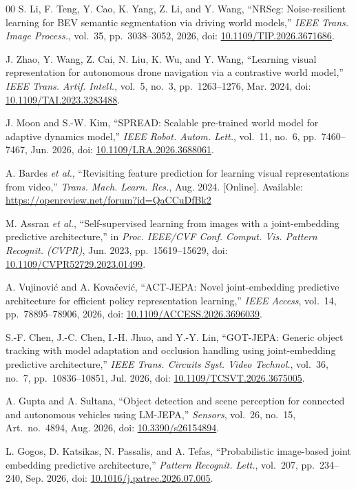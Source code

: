 \documentclass[conference,a4paper]{IEEEtran}
\begin{document}
\begin{thebibliography}{00}
S. Li, F. Teng, Y. Cao, K. Yang, Z. Li, and Y. Wang, ``NRSeg: Noise-resilient learning for BEV semantic segmentation via driving world models,'' \emph{IEEE Trans. Image Process.}, vol.~35, pp.~3038--3052, 2026, doi: \url{10.1109/TIP.2026.3671686}.

J. Zhao, Y. Wang, Z. Cai, N. Liu, K. Wu, and Y. Wang, ``Learning visual representation for autonomous drone navigation via a contrastive world model,'' \emph{IEEE Trans. Artif. Intell.}, vol.~5, no.~3, pp.~1263--1276, Mar. 2024, doi: \url{10.1109/TAI.2023.3283488}.

J. Moon and S.-W. Kim, ``SPREAD: Scalable pre-trained world model for adaptive dynamics model,'' \emph{IEEE Robot. Autom. Lett.}, vol.~11, no.~6, pp.~7460--7467, Jun. 2026, doi: \url{10.1109/LRA.2026.3688061}.

A. Bardes \emph{et al.}, ``Revisiting feature prediction for learning visual representations from video,'' \emph{Trans. Mach. Learn. Res.}, Aug. 2024. [Online]. Available: \url{https://openreview.net/forum?id=QaCCuDfBk2}

M. Assran \emph{et al.}, ``Self-supervised learning from images with a joint-embedding predictive architecture,'' in \emph{Proc. IEEE/CVF Conf. Comput. Vis. Pattern Recognit. (CVPR)}, Jun. 2023, pp.~15619--15629, doi: \url{10.1109/CVPR52729.2023.01499}.

A. Vujinovi{\'c} and A. Kova{\v{c}}evi{\'c}, ``ACT-JEPA: Novel joint-embedding predictive architecture for efficient policy representation learning,'' \emph{IEEE Access}, vol.~14, pp.~78895--78906, 2026, doi: \url{10.1109/ACCESS.2026.3696039}.

S.-F. Chen, J.-C. Chen, I.-H. Jhuo, and Y.-Y. Lin, ``GOT-JEPA: Generic object tracking with model adaptation and occlusion handling using joint-embedding predictive architecture,'' \emph{IEEE Trans. Circuits Syst. Video Technol.}, vol.~36, no.~7, pp.~10836--10851, Jul. 2026, doi: \url{10.1109/TCSVT.2026.3675005}.

A. Gupta and A. Sultana, ``Object detection and scene perception for connected and autonomous vehicles using LM-JEPA,'' \emph{Sensors}, vol.~26, no.~15, Art.~no.~4894, Aug. 2026, doi: \url{10.3390/s26154894}.

L. Gogos, D. Katsikas, N. Passalis, and A. Tefas, ``Probabilistic image-based joint embedding predictive architecture,'' \emph{Pattern Recognit. Lett.}, vol.~207, pp.~234--240, Sep. 2026, doi: \url{10.1016/j.patrec.2026.07.005}.


\end{thebibliography}
\end{document}
